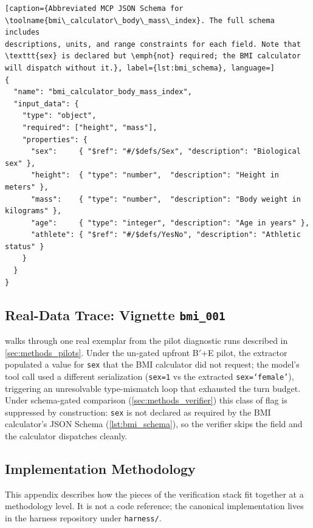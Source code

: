 \begin{lstlisting}[caption={Abbreviated MCP JSON Schema for
\toolname{bmi\_calculator\_body\_mass\_index}. The full schema includes
descriptions, units, and range constraints for each field. Note that
\texttt{sex} is declared but \emph{not} required; the BMI calculator
will dispatch without it.}, label={lst:bmi_schema}, language=]
{
  "name": "bmi_calculator_body_mass_index",
  "input_data": {
    "type": "object",
    "required": ["height", "mass"],
    "properties": {
      "sex":     { "$ref": "#/$defs/Sex", "description": "Biological sex" },
      "height":  { "type": "number",  "description": "Height in meters" },
      "mass":    { "type": "number",  "description": "Body weight in kilograms" },
      "age":     { "type": "integer", "description": "Age in years" },
      "athlete": { "$ref": "#/$defs/YesNo", "description": "Athletic status" }
    }
  }
}
\end{lstlisting}

\subsection{Real-Data Trace: Vignette \texttt{bmi\_001}}
\label{app:loop_trace}



 walks through one real exemplar from the pilot
diagnostic runs described in \cref{sec:methods_pilots}. Under the
un-gated upfront B$'$+E pilot, the extractor populated a value for
\texttt{sex} that the BMI calculator did not request; the model's
tool call used a different serialization (\texttt{sex=1} vs the
extracted \texttt{sex=`female'}), triggering an unresolvable
type-mismatch loop that exhausted the turn budget. Under
schema-gated comparison (\cref{sec:methods_verifier}) this class of
flag is suppressed by construction: \texttt{sex} is not declared as
required by the BMI calculator's JSON Schema
(\cref{lst:bmi_schema}), so the verifier skips the field and the
calculator dispatches cleanly.

\subsection{Implementation Methodology}
\label{app:implementation}

This appendix describes how the pieces of the verification stack fit
together at a methodology level. It is not a code reference; the
canonical implementation lives in the harness repository under
\verb|harness/|.


